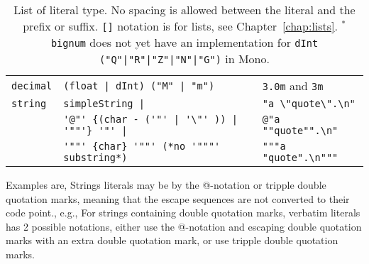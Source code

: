 \begin{table}
\begin{tabular}{|l|l|l|}
    \lstinline!decimal! &\lstinline[language=ebnf]!(float | dInt) ("M" | "m")! & \lstinline!3.0m! and \lstinline!3m!  \\
    \lstinline!string! & \lstinline[language=EBNF]!simpleString |! & \lstinline!"a \"quote\".\n"!  \\
         & \lstinline[language=EBNF]!'@"' {(char - ('"' | '\"' )) | '""'} '"' |!&\lstinline!@"a ""quote"".\n"! \\
         & \lstinline[language=EBNF]!'""' {char} '""' (*no '"""' substring*)! & \lstinline!"""a "quote".\n"""!  \\
    \hline
  \end{tabular}
  \caption{List of literal type. No spacing is allowed between the literal and the prefix or suffix. \lstinline![]! notation is for lists, see Chapter~\ref{chap:lists}. $^*$\lstinline[language=ebnf]!bignum! does not yet have an implementation for \lstinline[language=ebnf]!dInt ("Q"|"R"|"Z"|"N"|"G")! in Mono.}
  \label{tab:literalTypes}
\end{table}
Examples are,
%
Strings literals may be  by the @-notation or tripple double quotation marks, meaning that the escape sequences are not converted to their code point., e.g., 
%
%
For strings containing double quotation marks, verbatim literals has 2 possible notations, either use the @-notation and escaping double quotation marks with an extra double quotation mark, or use tripple double quotation marks. 


